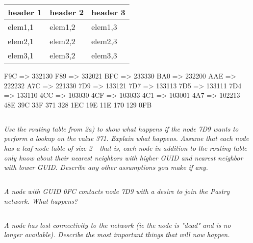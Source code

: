 \documentclass{article}
\newcommand{\question}[1]{\subsection{}\textit{#1}\bigskip}
\begin{document}
 \begin{table}[ht!]
    \begin{center}
    \begin{tabular}{| l | l | l |}
    \hline
    header 1        & header 2      & header 3 \\
    \hline
    elem1,1         & elem1,2       & elem1,3 \\
    \hline
    elem2,1         & elem2,2       & elem2,3 \\
    \hline
    elem3,1         & elem3,2       & elem3,3 \\
    \hline
    \end{tabular}
    \end{center}
\end{table}

F9C => 332130
F89 => 332021
BFC => 233330
BA0 => 232200
AAE => 222232
A7C => 221330
7D9 => 133121
7D7 => 133113
7D5 => 133111
7D4 => 133110
4CC => 103030
4CF => 103033
4C1 => 103001
4A7 => 102213
48E
39C
33F
371
328
1EC
19E
11E
170
129
0FB

 \question{Use the routing table from 2a) to show what happens if the node 7D9 wants to perform a lookup on the value 371. Explain what happens. Assume that each node has a leaf node table of size 2 - that is, each node in addition to the routing table only know about their nearest neighbors with higher GUID and nearest neighbor with lower GUID. Describe any other assumptions you make if any.}

 \question{A node with GUID 0FC contacts node 7D9 with a desire to join the Pastry network. What happens?}

 \question{A node has lost connectivity to the network (ie the node is "dead" and is no longer available). Describe the most important things that will now happen.}

 
\end{document}
